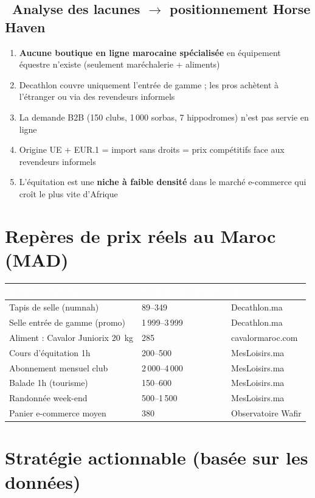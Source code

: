 \documentclass[11pt,a4paper]{article}
\newcommand{\thead}[1]{\textcolor{white}{\textbf{#1}}}
\begin{document}
\subsection{\faSearch\ Analyse des lacunes $\rightarrow$ positionnement Horse Haven}
\begin{enumerate}
  \item \textbf{Aucune boutique en ligne marocaine spécialisée} en équipement équestre n'existe (seulement maréchalerie + aliments)
  \item Decathlon couvre uniquement l'entrée de gamme ; les pros achètent à l'étranger ou via des revendeurs informels
  \item La demande B2B (150 clubs, 1\,000 sorbas, 7 hippodromes) n'est pas servie en ligne
  \item Origine UE + EUR.1 = import sans droits = prix compétitifs face aux revendeurs informels
  \item L'équitation est une \textbf{niche à faible densité} dans le marché e-commerce qui croît le plus vite d'Afrique
\end{enumerate}

\section{Repères de prix réels au Maroc (MAD)}
{\small
\noindent
\begin{tabular}{L{8.2cm} L{4.3cm} L{3cm}}
\toprule
{}
\thead{Article / Service} & \thead{Fourchette (MAD)} & \thead{Source}\\
\midrule
Tapis de selle (numnah) & 89--349 & Decathlon.ma\\
Selle entrée de gamme (promo) & 1\,999--3\,999 & Decathlon.ma\\
Aliment : Cavalor Juniorix 20~kg & 285 & cavalormaroc.com\\
Cours d'équitation 1h & 200--500 & MesLoisirs.ma\\
Abonnement mensuel club & 2\,000--4\,000 & MesLoisirs.ma\\
Balade 1h (tourisme) & 150--600 & MesLoisirs.ma\\
Randonnée week-end & 500--1\,500 & MesLoisirs.ma\\
Panier e-commerce moyen & 380 & Observatoire Wafir\\
\bottomrule
\end{tabular}}

\section{Stratégie actionnable (basée sur les données)}
\end{document}
